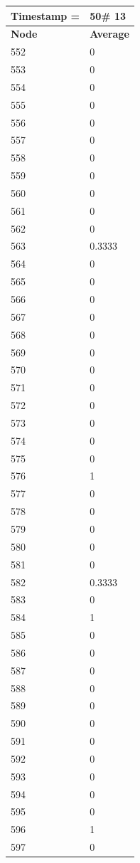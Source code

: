 \begin{tabular}{|l||l|}
\hline
\textbf{Timestamp =} & \textbf{50}\# 13\\\hline
	\textbf{Node} & \textbf{Average} \\ \hline
\hline
	552 & 0 \\ \hline
	553 & 0 \\ \hline
	554 & 0 \\ \hline
	555 & 0 \\ \hline
	556 & 0 \\ \hline
	557 & 0 \\ \hline
	558 & 0 \\ \hline
	559 & 0 \\ \hline
	560 & 0 \\ \hline
	561 & 0 \\ \hline
	562 & 0 \\ \hline
	563 & 0.3333 \\ \hline
	564 & 0 \\ \hline
	565 & 0 \\ \hline
	566 & 0 \\ \hline
	567 & 0 \\ \hline
	568 & 0 \\ \hline
	569 & 0 \\ \hline
	570 & 0 \\ \hline
	571 & 0 \\ \hline
	572 & 0 \\ \hline
	573 & 0 \\ \hline
	574 & 0 \\ \hline
	575 & 0 \\ \hline
	576 & 1 \\ \hline
	577 & 0 \\ \hline
	578 & 0 \\ \hline
	579 & 0 \\ \hline
	580 & 0 \\ \hline
	581 & 0 \\ \hline
	582 & 0.3333 \\ \hline
	583 & 0 \\ \hline
	584 & 1 \\ \hline
	585 & 0 \\ \hline
	586 & 0 \\ \hline
	587 & 0 \\ \hline
	588 & 0 \\ \hline
	589 & 0 \\ \hline
	590 & 0 \\ \hline
	591 & 0 \\ \hline
	592 & 0 \\ \hline
	593 & 0 \\ \hline
	594 & 0 \\ \hline
	595 & 0 \\ \hline
	596 & 1 \\ \hline
	597 & 0 \\ \hline
\end{tabular}
